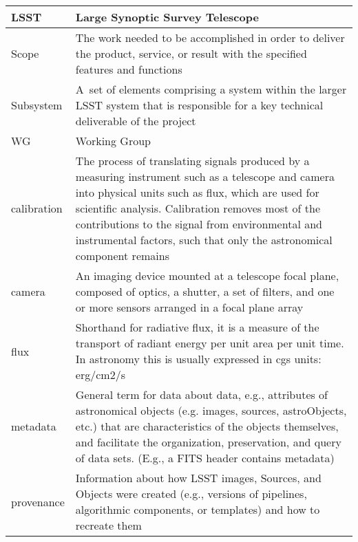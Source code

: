 \begin{longtable}{|p{}|p{}|}
LSST & Large Synoptic Survey Telescope \\\hline
Scope & The work needed to be accomplished in order to deliver the product, service, or result with the specified features and functions \\\hline
Subsystem & A set of elements comprising a system within the larger \gls{LSST} system that is responsible for a key technical deliverable of the project \\\hline
WG & Working Group \\\hline
calibration & The process of translating signals produced by a measuring instrument such as a telescope and \gls{camera} into physical units such as \gls{flux}, which are used for scientific analysis. Calibration removes most of the contributions to the signal from environmental and instrumental factors, such that only the astronomical component remains \\\hline
camera & An imaging device mounted at a telescope focal plane, composed of optics, a shutter, a set of filters, and one or more sensors arranged in a focal plane array \\\hline
flux & Shorthand for radiative \gls{flux}, it is a measure of the transport of radiant energy per unit area per unit time. In astronomy this is usually expressed in cgs units: erg/cm2/s \\\hline
metadata & General term for data about data, e.g., attributes of astronomical objects (e.g. images, sources, astroObjects, etc.) that are characteristics of the objects themselves, and facilitate the organization, preservation, and query of data sets. (E.g., a \gls{FITS} header contains \gls{metadata}) \\\hline
provenance & Information about how \gls{LSST} images, Sources, and Objects were created (e.g., versions of pipelines, algorithmic components, or templates) and how to recreate them \\\hline
\end{longtable}
